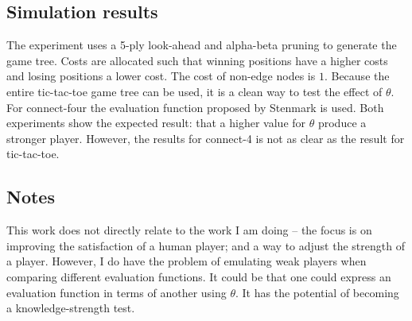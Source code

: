 \subsection{Simulation results}  The experiment uses a 5-ply look-ahead and alpha-beta pruning to generate the game tree.  Costs are allocated such that winning positions have a higher costs and losing positions a lower cost. The cost of non-edge nodes is $1$.  Because the entire tic-tac-toe game tree can be used, it is a clean way to test the effect of $\theta$.  For connect-four the evaluation function proposed by Stenmark \cite{stenmark:masters} is used.  Both experiments show the expected result: that a higher value for $\theta$ produce a stronger player.  However, the results for connect-4 is not as clear as the result for tic-tac-toe.
\subsection{Notes} This work does not directly relate to the work I am doing -- the focus is on improving the satisfaction of a human player; and a way to adjust the strength of a player.  However, I do have the problem of emulating weak players when comparing different evaluation functions.  It could be that one could express an evaluation function in terms of another using $\theta$.  It has the potential of becoming a knowledge-strength test. 

    